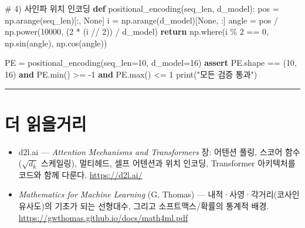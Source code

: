 \documentclass[
  korean,
]{article}
\newenvironment{Shaded}{\begin{snugshade}}{\end{snugshade}}
\newcommand{\BuiltInTok}[1]{\textcolor[rgb]{0.00,0.23,0.31}{#1}}
\newcommand{\CommentTok}[1]{\textcolor[rgb]{0.37,0.37,0.37}{#1}}
\newcommand{\ControlFlowTok}[1]{\textcolor[rgb]{0.00,0.23,0.31}{\textbf{#1}}}
\newcommand{\DecValTok}[1]{\textcolor[rgb]{0.68,0.00,0.00}{#1}}
\newcommand{\KeywordTok}[1]{\textcolor[rgb]{0.00,0.23,0.31}{\textbf{#1}}}
\newcommand{\NormalTok}[1]{\textcolor[rgb]{0.00,0.23,0.31}{#1}}
\newcommand{\OperatorTok}[1]{\textcolor[rgb]{0.37,0.37,0.37}{#1}}
\newcommand{\StringTok}[1]{\textcolor[rgb]{0.13,0.47,0.30}{#1}}
\newcommand{\VariableTok}[1]{\textcolor[rgb]{0.07,0.07,0.07}{#1}}
\providecommand{\tightlist}{%
  \setlength{\itemsep}{0pt}\setlength{\parskip}{0pt}}
\begin{document}
\begin{Shaded}
\begin{Highlighting}[]
\CommentTok{\# 4) 사인파 위치 인코딩}
\KeywordTok{def}\NormalTok{ positional\_encoding(seq\_len, d\_model):}
\NormalTok{    pos }\OperatorTok{=}\NormalTok{ np.arange(seq\_len)[:, }\VariableTok{None}\NormalTok{]}
\NormalTok{    i }\OperatorTok{=}\NormalTok{ np.arange(d\_model)[}\VariableTok{None}\NormalTok{, :]}
\NormalTok{    angle }\OperatorTok{=}\NormalTok{ pos }\OperatorTok{/}\NormalTok{ np.power(}\DecValTok{10000}\NormalTok{, (}\DecValTok{2} \OperatorTok{*}\NormalTok{ (i }\OperatorTok{//} \DecValTok{2}\NormalTok{)) }\OperatorTok{/}\NormalTok{ d\_model)}
    \ControlFlowTok{return}\NormalTok{ np.where(i }\OperatorTok{\%} \DecValTok{2} \OperatorTok{==} \DecValTok{0}\NormalTok{, np.sin(angle), np.cos(angle))}

\NormalTok{PE }\OperatorTok{=}\NormalTok{ positional\_encoding(seq\_len}\OperatorTok{=}\DecValTok{10}\NormalTok{, d\_model}\OperatorTok{=}\DecValTok{16}\NormalTok{)}
\ControlFlowTok{assert}\NormalTok{ PE.shape }\OperatorTok{==}\NormalTok{ (}\DecValTok{10}\NormalTok{, }\DecValTok{16}\NormalTok{) }\KeywordTok{and}\NormalTok{ PE.}\BuiltInTok{min}\NormalTok{() }\OperatorTok{\textgreater{}=} \OperatorTok{{-}}\DecValTok{1} \KeywordTok{and}\NormalTok{ PE.}\BuiltInTok{max}\NormalTok{() }\OperatorTok{\textless{}=} \DecValTok{1}
\BuiltInTok{print}\NormalTok{(}\StringTok{"모든 검증 통과"}\NormalTok{)}
\end{Highlighting}
\end{Shaded}

\begin{center}\rule{0.5\linewidth}{0.5pt}\end{center}

\section{더 읽을거리}\label{sec-reading}

\begin{itemize}
\tightlist
\item
  d2l.ai --- \emph{Attention Mechanisms and Transformers} 장: 어텐션
  풀링, 스코어 함수(\(\sqrt{d_k}\) 스케일링), 멀티헤드, 셀프 어텐션과
  위치 인코딩, Transformer 아키텍처를 코드와 함께 다룬다.
  \url{https://d2l.ai/}
\item
  \emph{Mathematics for Machine Learning} (G. Thomas) ---
  내적·사영·각거리(코사인 유사도)의 기초가 되는 선형대수, 그리고
  소프트맥스/확률의 통계적 배경.
  \url{https://gwthomas.github.io/docs/math4ml.pdf}
\end{itemize}
\end{document}
